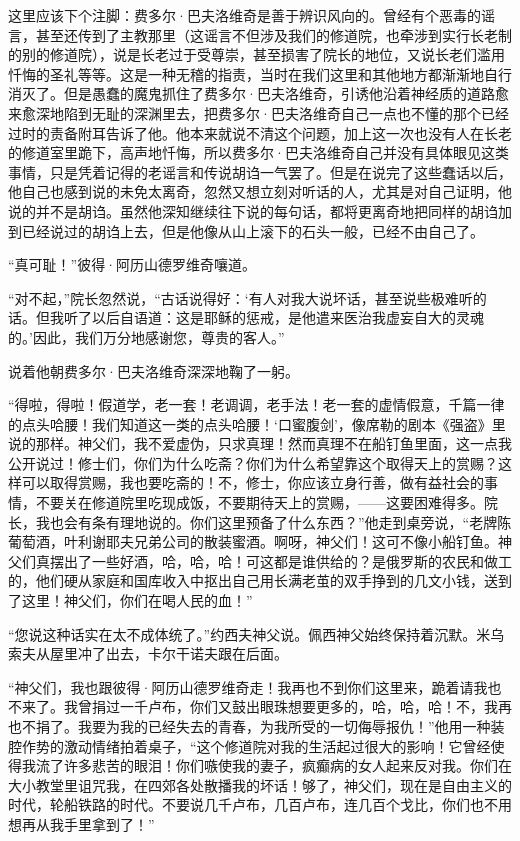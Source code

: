 \par 这里应该下个注脚：费多尔·巴夫洛维奇是善于辨识风向的。曾经有个恶毒的谣言，甚至还传到了主教那里（这谣言不但涉及我们的修道院，也牵涉到实行长老制的别的修道院），说是长老过于受尊崇，甚至损害了院长的地位，又说长老们滥用忏悔的圣礼等等。这是一种无稽的指责，当时在我们这里和其他地方都渐渐地自行消灭了。但是愚蠢的魔鬼抓住了费多尔·巴夫洛维奇，引诱他沿着神经质的道路愈来愈深地陷到无耻的深渊里去，把费多尔·巴夫洛维奇自己一点也不懂的那个已经过时的责备附耳告诉了他。他本来就说不清这个问题，加上这一次也没有人在长老的修道室里跪下，高声地忏悔，所以费多尔·巴夫洛维奇自己并没有具体眼见这类事情，只是凭着记得的老谣言和传说胡诌一气罢了。但是在说完了这些蠢话以后，他自己也感到说的未免太离奇，忽然又想立刻对听话的人，尤其是对自己证明，他说的并不是胡诌。虽然他深知继续往下说的每句话，都将更离奇地把同样的胡诌加到已经说过的胡诌上去，但是他像从山上滚下的石头一般，已经不由自己了。
\par “真可耻！”彼得·阿历山德罗维奇嚷道。
\par “对不起，”院长忽然说，“古话说得好：‘有人对我大说坏话，甚至说些极难听的话。但我听了以后自语道：这是耶稣的惩戒，是他遣来医治我虚妄自大的灵魂的。’因此，我们万分地感谢您，尊贵的客人。”
\par 说着他朝费多尔·巴夫洛维奇深深地鞠了一躬。
\par “得啦，得啦！假道学，老一套！老调调，老手法！老一套的虚情假意，千篇一律的点头哈腰！我们知道这一类的点头哈腰！‘口蜜腹剑’，像席勒的剧本《强盗》里说的那样。神父们，我不爱虚伪，只求真理！然而真理不在船钉鱼里面，这一点我公开说过！修士们，你们为什么吃斋？你们为什么希望靠这个取得天上的赏赐？这样可以取得赏赐，我也要吃斋的！不，修士，你应该立身行善，做有益社会的事情，不要关在修道院里吃现成饭，不要期待天上的赏赐，——这要困难得多。院长，我也会有条有理地说的。你们这里预备了什么东西？”他走到桌旁说，“老牌陈葡萄酒，叶利谢耶夫兄弟公司的散装蜜酒。啊呀，神父们！这可不像小船钉鱼。神父们真摆出了一些好酒，哈，哈，哈！可这都是谁供给的？是俄罗斯的农民和做工的，他们硬从家庭和国库收入中抠出自己用长满老茧的双手挣到的几文小钱，送到了这里！神父们，你们在喝人民的血！”
\par “您说这种话实在太不成体统了。”约西夫神父说。佩西神父始终保持着沉默。米乌索夫从屋里冲了出去，卡尔干诺夫跟在后面。
\par “神父们，我也跟彼得·阿历山德罗维奇走！我再也不到你们这里来，跪着请我也不来了。我曾捐过一千卢布，你们又鼓出眼珠想要更多的，哈，哈，哈！不，我再也不捐了。我要为我的已经失去的青春，为我所受的一切侮辱报仇！”他用一种装腔作势的激动情绪拍着桌子，“这个修道院对我的生活起过很大的影响！它曾经使得我流了许多悲苦的眼泪！你们嗾使我的妻子，疯癫病的女人起来反对我。你们在大小教堂里诅咒我，在四郊各处散播我的坏话！够了，神父们，现在是自由主义的时代，轮船铁路的时代。不要说几千卢布，几百卢布，连几百个戈比，你们也不用想再从我手里拿到了！”
